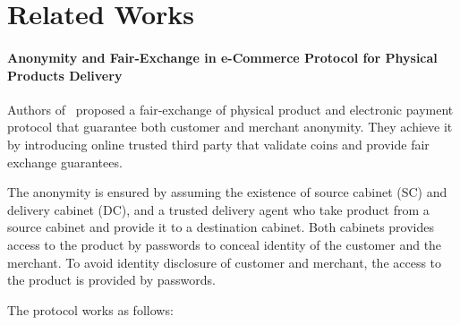 \documentclass{ieeeaccess}
\begin{document}
\section{Related Works}\label{sec:related-works}

\paragraph{Anonymity and Fair-Exchange in e-Commerce Protocol for Physical Products Delivery} \label{anonymity-and-fair-exchange-in-e-commerce-protocol-for-physical-products-delivery}

Authors of~\cite{birjoveanu2015anonymity} proposed a
fair-exchange of physical product and electronic payment protocol that
guarantee both customer and merchant anonymity. They achieve it by
introducing online trusted third party that validate coins and provide
fair exchange guarantees.

The anonymity is ensured by assuming the existence of source cabinet
(SC) and delivery cabinet (DC), and a trusted delivery agent who take
product from a source cabinet and provide it to a destination cabinet.
Both cabinets provides access to the product by passwords to conceal
identity of the customer and the merchant. To avoid identity disclosure
of customer and merchant, the access to the product is provided by
passwords.

The protocol works as follows: \begingroup
\renewcommand{\labelenumii}{\arabic{enumii}.}
\end{document}
